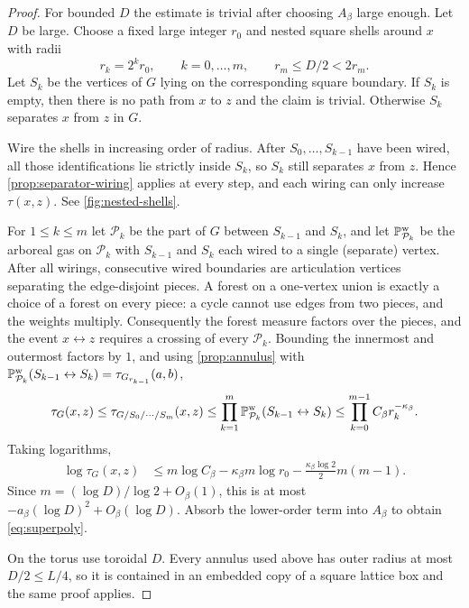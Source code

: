 \documentclass[11pt]{article}
\theoremstyle{definition}
\theoremstyle{remark}
\newcommand{\PP}{\mathbb P}
\newcommand{\1}{\mathbf 1}
\begin{document}
\begin{proof}
For bounded $D$ the estimate is trivial after choosing $A_\beta$ large enough.  Let
$D$ be large.  Choose a fixed large integer $r_0$ and nested square shells around
$x$ with radii
\begin{equation}
 r_k=2^kr_0,\qquad k=0,\dots,m,
 \qquad r_m\le D/2<2r_m.
\end{equation}
Let $S_k$ be the vertices of $G$ lying on the corresponding square boundary.  If
$S_k$ is empty, then there is no path from $x$ to $z$ and the claim is trivial.
Otherwise $S_k$ separates $x$ from $z$ in $G$.

Wire the shells in increasing order of radius.  After $S_0,\dots,S_{k-1}$ have
been wired, all those identifications lie strictly inside $S_k$, so $S_k$ still
separates $x$ from $z$.  Hence \cref{prop:separator-wiring} applies at every step,
and each wiring can only increase $\tau(x,z)$. See \cref{fig:nested-shells}.

For $1\le k\le m$ let $\mathcal P_k$ be the part of $G$ between $S_{k-1}$ and $S_k$, and let $\PP^{\rm w}_{\mathcal P_k}$
be the arboreal gas on $\mathcal P_k$ with $S_{k-1}$ and $S_k$ each wired to a single (separate) vertex.  After all
wirings, consecutive wired boundaries are articulation vertices separating the edge-disjoint pieces.  A forest on a one-vertex union is exactly a choice of a
forest on every piece: a cycle cannot use edges from two pieces, and the weights
multiply.  Consequently the forest measure factors over the pieces, and the event $x\leftrightarrow z$ requires a
crossing of every $\mathcal P_k$.  Bounding the innermost and outermost factors by $1$, and using \cref{prop:annulus}
with $\PP^{\rm w}_{\mathcal P_k}(S_{k-1}\leftrightarrow S_k)=\tau_{G_{r_{k-1}}}(a,b)$,
\begin{equation}\label{eq:annulus-product}
 \tau_G(x,z)\le\tau_{G/S_0/\cdots/S_m}(x,z)\le\prod_{k=1}^{m}\PP^{\rm w}_{\mathcal P_k}(S_{k-1}\leftrightarrow S_k)
 \le\prod_{k=0}^{m-1}C_\beta r_k^{-\kappa_\beta}.
\end{equation}
Taking logarithms,
\begin{equation}\begin{aligned}
 \log\tau_G(x,z)
 &\le m\log C_\beta
 -\kappa_\beta m\log r_0
 -\frac{\kappa_\beta\log2}{2}m(m-1).
\end{aligned}\end{equation}
Since $m=(\log D)/\log2+O_\beta(1)$, this is at most
$-a_\beta(\log D)^2+O_\beta(\log D)$.  Absorb the lower-order term into
$A_\beta$ to obtain \eqref{eq:superpoly}.

On the torus use toroidal $D$.  Every annulus used above has outer radius at most
$D/2\le L/4$, so it is contained in an embedded copy of a square lattice box and the
same proof applies.
\end{proof}
\end{document}
